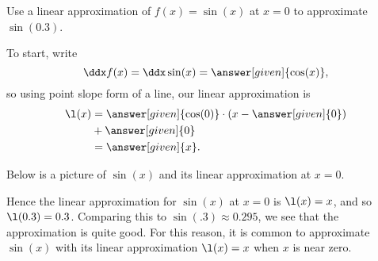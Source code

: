 \documentclass[handout,nooutcomes]{ximera}
\begin{document}

\begin{example}
Use a linear approximation of $f(x) =\sin(x)$ at $x=0$ to approximate
$\sin(0.3)$.
\begin{explanation}
To start, write
\[
\ddx f(x) = \ddx \sin(x) = \answer[given]{\cos(x)},
\]
so using point slope form of a line, our linear approximation is
\begin{align*}
\l(x) &= \answer[given]{\cos(0)}\cdot(x-\answer[given]{0}) \\
&+ \answer[given]{0}\\
&= \answer[given]{x}.
\end{align*}

Below is a picture of $\sin(x)$ and its linear approximation at $x=0$.

\begin{image}
\end{image}
Hence the linear approximation for $\sin(x)$ at $x=0$ is $\l(x) = x$,
and so $\l(0.3) = 0.3$.  Comparing this to $\sin(.3) \approx 0.295$,
we see that the approximation is quite good. For this reason, it is common
to approximate $\sin(x)$ with its linear approximation $\l(x) = x$
when $x$ is near zero.  
\end{explanation}
\end{example}
\end{document}
